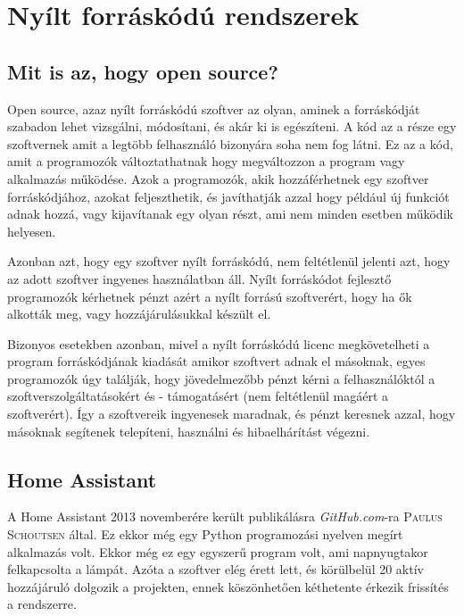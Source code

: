 \documentclass[
]{thesis-ekf}
\theoremstyle{definition}
\theoremstyle{remark}
\begin{document}
	\section{Nyílt forráskódú rendszerek}
	\subsection{Mit is az, hogy open source?}
	Open source, azaz nyílt forráskódú szoftver az olyan, aminek a forráskódját szabadon lehet vizsgálni, módosítani, és akár ki is egészíteni. A kód az a része egy szoftvernek amit a legtöbb felhasználó bizonyára soha nem fog látni. Ez az a kód, amit a programozók változtathatnak hogy megváltozzon a program vagy alkalmazás működése. Azok a programozók, akik hozzáférhetnek egy szoftver forráskódjához, azokat feljeszthetik, és javíthatják azzal hogy például új funkciót adnak hozzá, vagy kijavítanak egy olyan részt, ami nem minden esetben működik helyesen.\cite{what-is-open-source}
	
	Azonban azt, hogy egy szoftver nyílt forráskódú, nem feltétlenül jelenti azt, hogy az adott szoftver ingyenes használatban áll. Nyílt forráskódot fejlesztő programozók kérhetnek pénzt azért a nyílt forrású szoftverért, hogy ha ők alkották meg, vagy hozzájárulásukkal készült el. 
	
	Bizonyos esetekben azonban, mivel a nyílt forráskódú licenc megkövetelheti a program forráskódjának kiadását amikor szoftvert adnak el másoknak, egyes programozók úgy találják, hogy jövedelmezőbb pénzt kérni a felhasználóktól a szoftverszolgáltatásokért és - támogatásért (nem feltétlenül magáért a szoftverért). Így a szoftvereik ingyenesek maradnak, és pénzt keresnek azzal, hogy másoknak segítenek telepíteni, használni és hibaelhárítást végezni.\cite{what-is-open-source}
	
	\subsection{Home Assistant}
	A Home Assistant 2013 novemberére került publikálásra \emph{GitHub.com}-ra \textsc{Paulus Schoutsen} által. Ez ekkor még egy Python programozási nyelven megírt alkalmazás volt.
	Ekkor még ez egy egyszerű program volt, ami napnyugtakor felkapcsolta a lámpát. Azóta a szoftver elég érett lett, és körülbelül 20 aktív hozzájáruló dolgozik a projekten, ennek köszönhetően kéthetente érkezik frissítés a rendszerre.\cite{creation-of-home-assistant}
	
\end{document}
